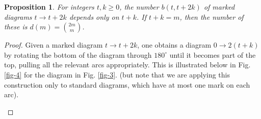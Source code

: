 \documentclass[12pt]{amsart}
\newtheorem{proposition}[theorem]{Proposition}
\theoremstyle{definition}
\theoremstyle{remark}
\numberwithin{equation}{section}
\newcommand{\lr}{\longrightarrow}
\begin{document}
\begin{proposition}\label{prop:tlbdim}
For integers $t,k\geq 0$, the number $b(t,t+2k)$ of marked diagrams $t\lr t+2k$ depends only on $t+k$. If $t+k=m$, then 
the number of these is $d(m)=\binom{2m}{m}$.
\end{proposition}
\begin{proof}
Given a marked diagram $t\lr t+2k$, one obtains a diagram $0\lr 2(t+k)$ by rotating the bottom of the diagram through 
$180^\circ$ until it becomes part of the top, pulling all the relevant arcs appropriately. This is illustrated below in Fig. \ref{fig-4}  for the diagram
in Fig. \ref{fig-3}. (but note that we are applying this construction only to standard diagrams, which have at most one mark on each arc).

\begin{figure}[h]
\begin{center}
\end{center}
\end{figure}
\end{proof}
\end{document}
